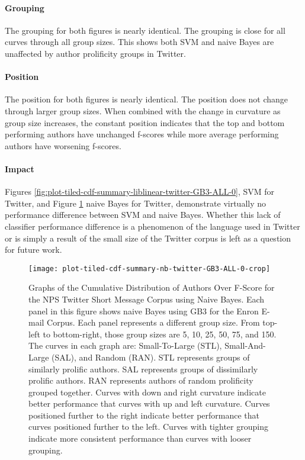  \paragraph*{Grouping} The grouping for both figures is nearly identical.  The grouping is close for all curves through all group sizes. This shows both SVM and naive Bayes are unaffected by author prolificity groups in Twitter.
 \paragraph*{Position} The position for both figures is nearly identical. The position does not change through larger group sizes.  When combined with the change in curvature as group size increases, the constant position indicates that the top and bottom performing authors have unchanged f-scores while more average performing authors have worsening f-scores.
 \paragraph*{Impact}  Figures \ref{fig:plot-tiled-cdf-summary-liblinear-twitter-GB3-ALL-0}, SVM for Twitter, and Figure \ref{fig:plot-tiled-cdf-summary-nb-twitter-GB3-ALL-0} naive Bayes for Twitter, demonstrate virtually no performance difference between SVM and naive Bayes.  Whether this lack of classifier performance difference is a phenomenon of the language used in Twitter or is simply a result of the small size of the Twitter corpus is left as a question for future work.
	\begin{figure}[htbp!]
		\begin{center}
		\centering
		\texttt{[image: plot-tiled-cdf-summary-nb-twitter-GB3-ALL-0-crop]}
		\caption{Graphs of the Cumulative Distribution of Authors Over F-Score for the NPS Twitter Short Message Corpus using Naive Bayes. Each panel in this figure shows naive Bayes using GB3 for the Enron E-mail Corpus.  Each panel represents a different group size.  From top-left to bottom-right, those group sizes are 5, 10, 25, 50, 75, and 150. The curves in each graph are: Small-To-Large (STL), Small-And-Large (SAL), and Random (RAN).  STL represents groups of similarly prolific authors.  SAL represents groups of dissimilarly prolific authors.  RAN represents authors of random prolificity grouped together.  Curves with down and right curvature indicate better performance that curves with up and left curvature.  Curves positioned further to the right indicate better performance that curves positioned further to the left.  Curves with tighter grouping indicate more consistent performance than curves with looser grouping.}
		\label{fig:plot-tiled-cdf-summary-nb-twitter-GB3-ALL-0}
		\end{center}
	\end{figure}
	

